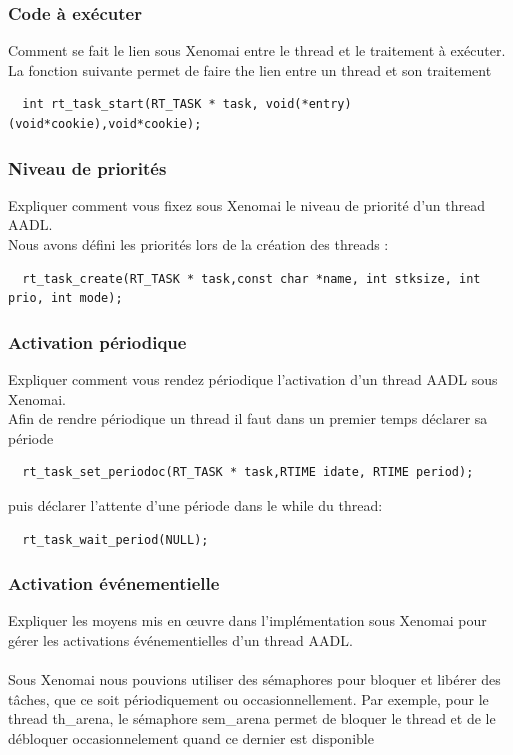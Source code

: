 \documentclass[11pt, a4paper]{paper}
\begin{document}
{{{%
\subsubsection{Code à exécuter}
 {\color{blue} Comment se fait le lien sous Xenomai entre le thread et le traitement à exécuter.}\\
 
 {\color{black} La fonction suivante permet de faire the lien entre un thread et son traitement}
\begin{verbatim}
  int rt_task_start(RT_TASK * task, void(*entry)(void*cookie),void*cookie);
\end{verbatim}
 

\subsubsection{Niveau de priorités}
 {\color{blue} Expliquer comment vous fixez sous Xenomai le niveau de priorité d'un thread AADL.}\\
 
{\color{black} Nous avons défini les priorités lors de la création des threads : }
\begin{verbatim}
  rt_task_create(RT_TASK * task,const char *name, int stksize, int prio, int mode);
\end{verbatim}

\subsubsection{Activation périodique}
 {\color{blue} Expliquer comment vous rendez périodique l'activation d'un thread AADL sous Xenomai.}\\
 
{\color{black} Afin de rendre périodique un thread il faut dans un premier temps déclarer sa période}
\begin{verbatim}
  rt_task_set_periodoc(RT_TASK * task,RTIME idate, RTIME period);
\end{verbatim}
{\color{black} puis déclarer l'attente d'une période dans le while du thread:}
\begin{verbatim}
  rt_task_wait_period(NULL);
\end{verbatim}

\subsubsection{Activation événementielle}
 {\color{blue} Expliquer les moyens mis en {\oe}uvre dans l'implémentation sous Xenomai pour gérer les activations événementielles d'un thread AADL.}\\ \\
{\color{black} Sous Xenomai nous pouvions utiliser des sémaphores pour bloquer et libérer des tâches, que ce soit périodiquement ou occasionnellement. Par exemple, pour le thread th\_arena, le sémaphore sem_arena permet de bloquer le thread et de le débloquer occasionnelement quand ce dernier est disponible}
 
}}}
\end{document}
